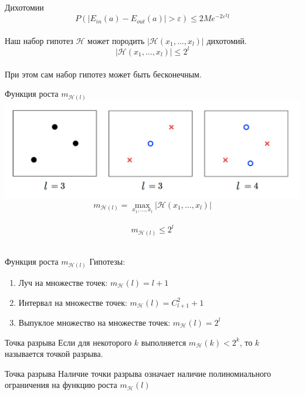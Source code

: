 \documentclass[10pt]{beamer}
\begin{document}
{
\begin{frame}{Дихотомии}  
  $$P(\vert E_{in}(a) - E_{out}(a) \vert > \varepsilon) \leq 2 M e^{-2\varepsilon^2l}$$  \\
  Наш набор гипотез $\mathcal{H}$ может породить $\vert \mathcal{H}(x_1,\dots, x_l) \vert$ дихотомий.\\
  $$\vert \mathcal{H}(x_1,\dots, x_l) \vert \leq 2^l$$\\
  При этом сам набор гипотез может быть бесконечным.
\end{frame}
}

\begin{frame}{Функция роста $m_{\mathcal{H}(l)}$}  
  \centering
  \includegraphics[width=\textwidth, keepaspectratio]{images/growth}
  $$m_{\mathcal{H}(l)} = \max\limits_{x_1,\dots,x_l} \vert \mathcal{H}(x_1,\dots, x_l) \vert$$\\
  $$m_{\mathcal{H}(l)} \leq 2^l$$\\
\end{frame}

\begin{frame} {Функция роста $m_{\mathcal{H}(l)}$}
  Гипотезы:\\  
  \begin{enumerate}
    \item Луч на множестве точек: $m_{\mathcal{H}}(l) = l+1 $
    \item Интервал на множестве точек: $m_{\mathcal{H}}(l) = C_{l+1}^2 + 1$
    \item Выпуклое множество на множестве точек: $m_{\mathcal{H}}(l) = 2^l$ 
  \end{enumerate}
\end{frame}

{
\begin{frame}{Точка разрыва}  
  Если для некоторого $k$ выполняется $m_{\mathcal{H}}(k) < 2^k$, то $k$ называется точкой разрыва.
\end{frame}
}

\begin{frame}{Точка разрыва}  
  \centering
  Наличие точки разрыва означает наличие полиномиального ограничения на функцию роста $m_{\mathcal{H}}(l)$
\end{frame}
\end{document}

